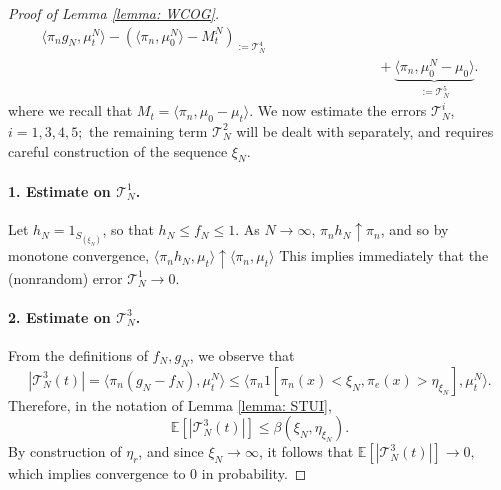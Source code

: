 \documentclass[11pt, notitlepage]{article}
\begin{document}
\begin{proof}[Proof of Lemma \ref{lemma: WCOG}]
\begin{equation}
\begin{split}
{   \langle \pi_n g_N, \mu^N_t\rangle - (\langle \pi_n, \mu^N_0\rangle-M^N_t)}_{:=\mathcal{T}^4_N}
   \\[1ex]&\hspace{3cm}+ \underbrace{\langle \pi_n, \mu^N_0-\mu_0\rangle}_{:=\mathcal{T}^5_N} .\end{split} \end{equation} where we recall that $M_t=\langle \pi_n, \mu_0-\mu_t\rangle$. We now estimate the errors $\mathcal{T}^i_N$, $i=1,3,4,5;$ the remaining term $\mathcal{T}^2_N$ will be dealt with separately, and requires careful construction of the sequence $\xi_N$. \paragraph{1. Estimate on $\mathcal{T}^1_N$.} Let $h_N=1_{S_{(\xi_N)}}$, so that $h_N \le f_N \le 1$. As $N\rightarrow \infty$, $\pi_n h_N \uparrow \pi_n$, and so by monotone convergence, $
       \langle \pi_n h_N, \mu_t\rangle \uparrow \langle \pi_n, \mu_t\rangle$ This implies immediately that the (nonrandom) error $\mathcal{T}^1_N \rightarrow 0$.
\paragraph{2. Estimate on $\mathcal{T}^3_N$.} From the definitions of $f_N, g_N$, we observe that \begin{equation}
       |\mathcal{T}^3_N(t)|=\langle \pi_n(g_N-f_N), \mu^N_t\rangle \le  \langle \pi_n 1[\pi_n(x)<\xi_N, \pi_e(x)>\eta_{\xi_N}], \mu^N_t\rangle.
   \end{equation} Therefore, in the notation of Lemma \ref{lemma: STUI}, \begin{equation}
       \mathbb{E}\left[|\mathcal{T}^3_N(t)|\right] \leq \beta(\xi_N, \eta_{\xi_N}).
   \end{equation} By construction of $\eta_r$, and since $\xi_N \rightarrow \infty$, it follows that $\mathbb{E}[ |\mathcal{T}^3_N(t)|] \rightarrow 0,$ which implies convergence to $0$ in probability.

\end{proof}
\end{document}
